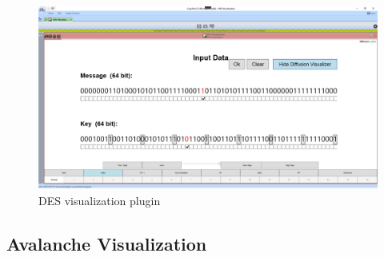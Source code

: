 \begin{figure}
\label{fig:des}
\centering
\includegraphics[width=\textwidth]{figures/ct2/des.png}
\caption{DES visualization plugin}
\end{figure}

\subsection{Avalanche Visualization}
\label{sec:avalancheVisualization}


